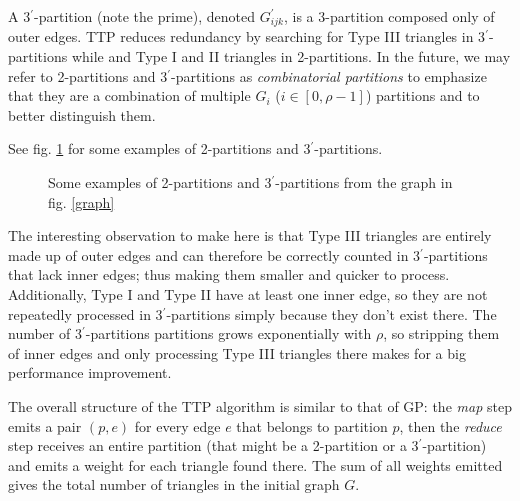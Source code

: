 \documentclass[paper=a4, fontsize=11pt]{scrartcl}
\begin{document}
A 3$^\prime$-partition (note the prime), denoted $G^{\prime}_{ijk}$, is a
3-partition composed only of outer edges. TTP reduces redundancy by searching
for Type III triangles in 3$^\prime$-partitions while and Type I and II
triangles in 2-partitions. In the future, we may refer to 2-partitions and
3$^\prime$-partitions as \emph{combinatorial partitions} to emphasize that they
are a combination of multiple $G_i$ ($i\in[0, \rho-1]$) partitions and to better
distinguish them.

See fig. \ref{ttp} for some examples of 2-partitions and 3$^\prime$-partitions.

\begin{figure}[h]
    \centering

    \hspace{20pt}
    \hspace{20pt}

    \par\bigskip

    \hspace{20pt}
    \caption{Some examples of 2-partitions and 3$^\prime$-partitions from the
    graph in fig. \ref{graph}}
    \label{ttp}
\end{figure}

The interesting observation to make here is that Type III triangles are entirely
made up of outer edges and can therefore be correctly counted in
3$^\prime$-partitions that lack inner edges; thus making them smaller and
quicker to process. Additionally, Type I and Type II have at least one inner
edge, so they are not repeatedly processed in 3$^\prime$-partitions simply
because they don't exist there. The number of 3$^\prime$-partitions partitions
grows exponentially with $\rho$, so stripping them of inner edges and only
processing Type III triangles there makes for a big performance improvement.

The overall structure of the TTP algorithm is similar to that of GP: the
\emph{map} step emits a pair $(p, e)$ for every edge $e$ that belongs to
partition $p$, then the \emph{reduce} step receives an entire partition (that
might be a 2-partition or a 3$^\prime$-partition) and emits a weight for each
triangle found there. The sum of all weights emitted gives the total number of
triangles in the initial graph $G$.
\end{document}
